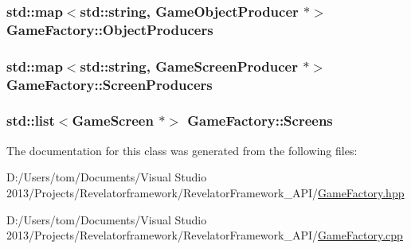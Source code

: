 \hypertarget{class_game_factory_ab72819fc3f241243d44827f75e0a2886}{
\subsubsection[{Object\-Producers}]{\setlength{\rightskip}{0pt plus 5cm}std\-::map$<$std\-::string, {\bf Game\-Object\-Producer} $\ast$$>$ Game\-Factory\-::\-Object\-Producers\hspace{0.3cm}{\ttfamily [private]}}}\label{class_game_factory_ab72819fc3f241243d44827f75e0a2886}
\hypertarget{class_game_factory_aa65ba67e6c3fc56ec228c801e02352c8}{
\subsubsection[{Screen\-Producers}]{\setlength{\rightskip}{0pt plus 5cm}std\-::map$<$std\-::string, {\bf Game\-Screen\-Producer} $\ast$$>$ Game\-Factory\-::\-Screen\-Producers\hspace{0.3cm}{\ttfamily [private]}}}\label{class_game_factory_aa65ba67e6c3fc56ec228c801e02352c8}
\hypertarget{class_game_factory_a16a8135f6d6b1b60c0d08b39340b34cc}{
\subsubsection[{Screens}]{\setlength{\rightskip}{0pt plus 5cm}std\-::list$<${\bf Game\-Screen} $\ast$$>$ Game\-Factory\-::\-Screens\hspace{0.3cm}{\ttfamily [private]}}}\label{class_game_factory_a16a8135f6d6b1b60c0d08b39340b34cc}


The documentation for this class was generated from the following files\-:\begin{DoxyCompactItemize}
\item 
D\-:/\-Users/tom/\-Documents/\-Visual Studio 2013/\-Projects/\-Revelatorframework/\-Revelator\-Framework\-\_\-\-A\-P\-I/\hyperlink{_game_factory_8hpp}{Game\-Factory.\-hpp}\item 
D\-:/\-Users/tom/\-Documents/\-Visual Studio 2013/\-Projects/\-Revelatorframework/\-Revelator\-Framework\-\_\-\-A\-P\-I/\hyperlink{_game_factory_8cpp}{Game\-Factory.\-cpp}\end{DoxyCompactItemize}
